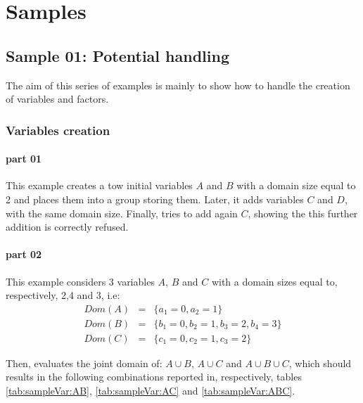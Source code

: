 \newpage
\chapter{Samples}
\label{chap:Samples}

\section{Sample 01: Potential handling}

The aim of this series of examples is mainly to show how to handle the creation of variables and factors.

\subsection{Variables creation}

\subsubsection{part 01}

This example creates a tow initial variables $A$ and $B$ with a domain size equal to 2 and places them into a group storing them. Later, it adds variables $C$ and $D$, with the same domain size. Finally, tries to add again $C$, showing the this further addition is correctly refused.

\subsubsection{part 02}

This example considers 3 variables $A$, $B$ and $C$ with a domain sizes equal to, respectively, 2,4 and 3, i.e:
\begin{eqnarray}
Dom(A) &=& \lbrace a_1 = 0, a_2 = 1 \rbrace \nonumber\\
Dom(B) &=& \lbrace b_1 = 0, b_2 = 1, b_3 = 2, b_4 = 3 \rbrace \nonumber\\
Dom(C) &=& \lbrace c_1 = 0, c_2 = 1, c_3 = 2 \rbrace
\end{eqnarray}

Then, evaluates the joint domain of: $A \cup B$, $A \cup C$ and $A \cup B \cup C$, which should results in the following combinations reported in, respectively, tables \ref{tab:sampleVar:AB}, \ref{tab:sampleVar:AC} and \ref{tab:sampleVar:ABC}.

